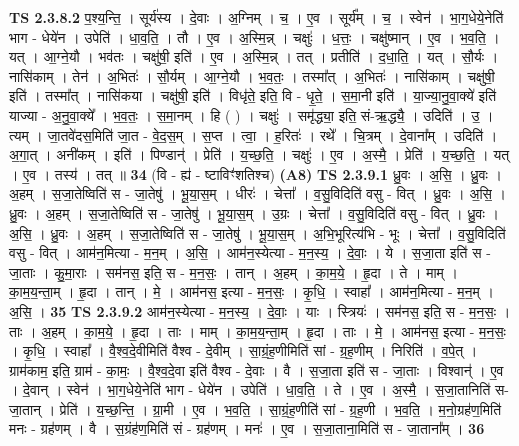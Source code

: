 \documentclass[17pt]{extarticle}
\begin{document}
                  \newline
                                \textbf{ TS 2.3.8.2} \newline
                  प॒श्य॒न्ति॒ । सूर्य॑स्य । दे॒वाः । अ॒ग्निम् । च॒ । ए॒व । सूर्य᳚म् । च॒ । स्वेन॑ । भा॒ग॒धेये॒नेति॑ भाग - धेये॑न । उपेति॑ । धा॒व॒ति॒ । तौ । ए॒व । अ॒स्मि॒न्न् । चक्षुः॑ । ध॒त्तः॒ । चक्षु॑ष्मान् । ए॒व । भ॒व॒ति॒ । यत् । आ॒ग्ने॒यौ । भव॑तः । चक्षु॑षी॒ इति॑ । ए॒व । अ॒स्मि॒न्न् । तत् । प्रतीति॑ । द॒धा॒ति॒ । यत् । सौ॒र्यः । नासि॑काम् । तेन॑ । अ॒भितः॑ । सौ॒र्यम् । आ॒ग्ने॒यौ । भ॒व॒तः॒ । तस्मा᳚त् । अ॒भितः॑ । नासि॑काम् । चक्षु॑षी॒ इति॑ । तस्मा᳚त् । नासि॑कया । चक्षु॑षी॒ इति॑ । विधृ॑ते॒ इति॒ वि - धृ॒ते॒ । स॒मा॒नी इति॑ । या॒ज्या॒नु॒वा॒क्ये॑ इति॑ याज्या - अ॒नु॒वा॒क्ये᳚ । भ॒व॒तः॒ । स॒मा॒नम् । हि ( ) । चक्षुः॑ । समृ॑द्ध्या॒ इति॒ सं-ऋ॒द्ध्यै॒ । उदिति॑ ।   उ॒ । त्यम् । जा॒तवे॑दस॒मिति॑ जा॒त - वे॒द॒स॒म् । स॒प्त । त्वा॒ । ह॒रितः॑ । रथे᳚ । चि॒त्रम् । दे॒वाना᳚म् । उदिति॑ । अ॒गा॒त् । अनी॑कम् । इति॑ । पिण्डान्॑ । प्रेति॑ । य॒च्छ॒ति॒ । चक्षुः॑ । ए॒व । अ॒स्मै॒ । प्रेति॑ । य॒च्छ॒ति॒ । यत् । ए॒व । तस्य॑ । तत् ॥ \textbf{  34 } \newline
                  \newline
                      (वि - ह्य॑ - ष्टाविꣳ॑शतिश्च)  \textbf{(A8)} \newline \newline
                                \textbf{ TS 2.3.9.1} \newline
                  ध्रु॒वः । अ॒सि॒ । ध्रु॒वः । अ॒हम् । स॒जा॒तेष्विति॑ स - जा॒तेषु॑ । भू॒या॒स॒म् । धीरः॑ । चेत्ता᳚ । व॒सु॒विदिति॑ वसु - वित् । ध्रु॒वः । अ॒सि॒ । ध्रु॒वः । अ॒हम् । स॒जा॒तेष्विति॑ स - जा॒तेषु॑ । भू॒या॒स॒म् । उ॒ग्रः । चेत्ता᳚ । व॒सु॒विदिति॑ वसु - वित् । ध्रु॒वः । अ॒सि॒ ।  ध्रु॒वः । अ॒हम् । स॒जा॒तेष्विति॑ स - जा॒तेषु॑ । भू॒या॒स॒म् । अ॒भि॒भूरित्य॑भि - भूः । चेत्ता᳚ । व॒सु॒विदिति॑ वसु - वित् । आम॑न॒मित्या - म॒न॒म् । अ॒सि॒ । आम॑न॒स्येत्या - म॒न॒स्य॒ । दे॒वाः॒ । ये ।  स॒जा॒ता इति॑ स - जा॒ताः । कु॒मा॒राः । सम॑नस॒ इति॒ स - म॒न॒सः॒ । तान् । अ॒हम् । का॒म॒ये॒ । हृ॒दा । ते । माम् । का॒म॒य॒न्ता॒म् । हृ॒दा । तान् । मे॒ । आम॑नस॒ इत्या - म॒न॒सः॒ । कृ॒धि॒ । स्वाहा᳚ । आम॑न॒मित्या - म॒न॒म् । अ॒सि॒ । \textbf{  35} \newline
                  \newline
                                \textbf{ TS 2.3.9.2} \newline
                  आम॑न॒स्येत्या - म॒न॒स्य॒ । दे॒वाः॒ । याः । स्त्रियः॑ । सम॑नस॒ इति॒ स - म॒न॒सः॒ । ताः । अ॒हम् । का॒म॒ये॒ । हृ॒दा । ताः । माम् । का॒म॒य॒न्ता॒म् । हृ॒दा । ताः । मे॒ । आम॑नस॒ इत्या - म॒न॒सः॒ । कृ॒धि॒ । स्वाहा᳚ । वै॒श्व॒दे॒वीमिति॑ वैश्व - दे॒वीम् । सा॒ग्रं॒ह॒णीमिति॑ सां - ग्र॒ह॒णीम् । निरिति॑ । व॒पे॒त् । ग्राम॑काम॒ इति॒ ग्राम॑ - का॒मः॒ । वै॒श्व॒दे॒वा इति॑ वैश्व - दे॒वाः । वै । स॒जा॒ता इति॑ स - जा॒ताः । विश्वान्॑ । ए॒व । दे॒वान् । स्वेन॑ । भा॒ग॒धेये॒नेति॑ भाग - धेये॑न । उपेति॑ । धा॒व॒ति॒ । ते । ए॒व । अ॒स्मै॒ । स॒जा॒तानिति॑ स-जा॒तान् । प्रेति॑ । य॒च्छ॒न्ति॒ । ग्रा॒मी ।  ए॒व । भ॒व॒ति॒ । सा॒ग्रं॒ह॒णीति॑ सां - ग्र॒ह॒णी । भ॒व॒ति॒ । म॒नो॒ग्रह॑ण॒मिति॑ मनः - ग्रह॑णम् । वै । स॒ग्रंह॑ण॒मिति॑ सं - ग्रह॑णम् । मनः॑ ।  ए॒व । स॒जा॒ताना॒मिति॑ स - जा॒ताना᳚म् । \textbf{  36} \newline
\end{document}
